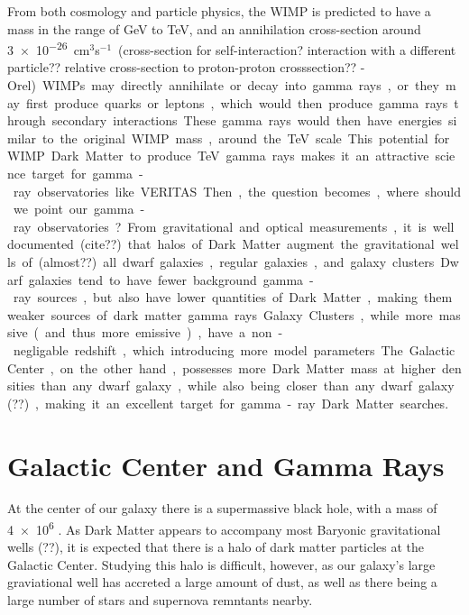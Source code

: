   From both cosmology and particle physics, the WIMP is predicted to have a mass in the range of GeV to TeV, and an annihilation cross-section around \nicetilde{}\SI{3e-26}{cm${}^3$s${}^{-1}$} {\color{red}(cross-section for self-interaction? interaction with a different particle?? relative cross-section to proton-proton crosssection?? -Orel)}.
  WIMPs may directly annihilate or decay into gamma rays, or they may first produce quarks or leptons, which would then produce gamma rays through secondary interactions.
  These gamma rays would then have energies similar to the original WIMP mass, around the TeV scale.
  This potential for WIMP Dark Matter to produce TeV gamma rays makes it an attractive science target for gamma-ray observatories like VERITAS.

  Then, the question becomes, where should we point our gamma-ray observatories?
  From gravitational and optical measurements, it is well documented {\color{red}(cite??)} that halos of Dark Matter augment the gravitational wells of {\color{red}(almost??)} all dwarf galaxies, regular galaxies, and galaxy clusters.
  Dwarf galaxies tend to have fewer background gamma-ray sources, but also have lower quantities of Dark Matter, making them weaker sources of dark matter gamma rays.
  Galaxy Clusters, while more massive (and thus more emissive), have a non-negligable redshift, which introducing more model parameters.
  The Galactic Center, on the other hand, possesses more Dark Matter mass at higher densities than any dwarf galaxy, while also being closer than any dwarf galaxy {\color{red}(??)}, making it an excellent target for gamma-ray Dark Matter searches.


\section{Galactic Center and Gamma Rays}

  At the center of our galaxy there is a supermassive black hole, with a mass of \SI{4e6}{\Msol{}} \cite{sgra_massdist}.
  As Dark Matter appears to accompany most Baryonic gravitational wells {\color{red}(??)}, it is expected that there is a halo of dark matter particles at the Galactic Center.
  Studying this halo is difficult, however, as our galaxy's large graviational well has accreted a large amount of dust, as well as there being a large number of stars and supernova remntants nearby.

